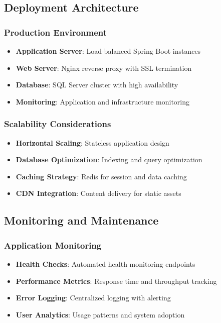 \documentclass[12pt,a4paper]{article}
\begin{document}
\subsection{Deployment Architecture}

\subsubsection{Production Environment}
\begin{itemize}
    \item \textbf{Application Server}: Load-balanced Spring Boot instances
    \item \textbf{Web Server}: Nginx reverse proxy with SSL termination
    \item \textbf{Database}: SQL Server cluster with high availability
    \item \textbf{Monitoring}: Application and infrastructure monitoring
\end{itemize}

\subsubsection{Scalability Considerations}
\begin{itemize}
    \item \textbf{Horizontal Scaling}: Stateless application design
    \item \textbf{Database Optimization}: Indexing and query optimization
    \item \textbf{Caching Strategy}: Redis for session and data caching
    \item \textbf{CDN Integration}: Content delivery for static assets
\end{itemize}

\subsection{Monitoring and Maintenance}

\subsubsection{Application Monitoring}
\begin{itemize}
    \item \textbf{Health Checks}: Automated health monitoring endpoints
    \item \textbf{Performance Metrics}: Response time and throughput tracking
    \item \textbf{Error Logging}: Centralized logging with alerting
    \item \textbf{User Analytics}: Usage patterns and system adoption
\end{itemize}
\end{document}
